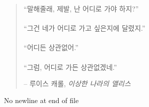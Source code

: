
\newpage \vspace*{4cm}
\thispagestyle{empty}
\begin{quotation}
	\begin{center}
		\large
		\enquote{말해줄래, 제발, 난 어디로 가야 하지?} \\~\\
		\enquote{그건 네가 어디로 가고 싶은지에 달렸지.} \\~\\
		\enquote{어디든 상관없어.} \\~\\
		\enquote{그럼, 어디로 가든 상관없겠네.}
	\end{center}
	\begin{flushright} -- 루이스 캐롤, \textit{이상한 나라의 앨리스}\end{flushright}
\end{quotation}
No newline at end of file
